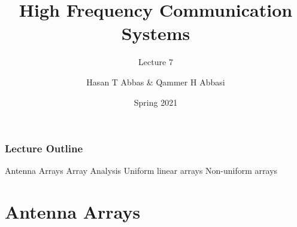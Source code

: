 \documentclass[10pt]{beamer}
\title{High Frequency Communication Systems}
\subtitle{Lecture 7}
\date{Spring 2021}
\author{Hasan T Abbas \& Qammer H Abbasi}
\begin{document}
\maketitle

\begin{frame}[fragile]
    \frametitle{Lecture Outline}
    \begin{outline}[itemize]
        \1 Antenna Arrays
        \1 Array Analysis
        \2 Uniform linear arrays 
        \2 Non-uniform arrays
    \end{outline}
\end{frame}

\section{Antenna Arrays}
\end{document}
